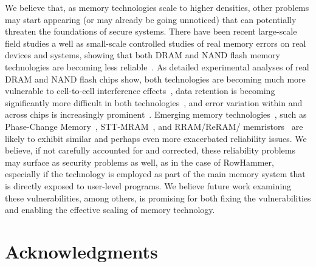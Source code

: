 \documentclass[runningheads]{llncs}
\begin{document}
We believe that, as memory technologies scale to higher densities,
other problems may start appearing (or may already be going unnoticed)
that can potentially threaten the foundations of secure systems. There
have been recent large-scale field studies a well as small-scale
controlled studies of real memory errors on real devices and systems,
showing that both DRAM and NAND flash memory technologies are becoming
less reliable~\cite{superfri14,justin-memerrors-dsn15,dram-field-analysis2,dram-field-analysis3,dram-field-analysis4,justin-flash-sigmetrics15,flash-field-analysis2,cai2017errors,cai2017error,luo2018improving,luo2018heatwatch,cai-date12,cai-hpca15,mutlu-imw13,patel2017reach,onur-date17}. As detailed experimental
analyses of real DRAM and NAND flash chips show, both technologies are
becoming much more vulnerable to cell-to-cell interference
effects~\cite{superfri14,rowhammer-isca2014,cai-dsn15,cai-sigmetrics14,cai-iccd13,cai-date12,cai-date13,flash-fms-talk,yixin-jsac16,cai-hpca17,cai2017errors,cai2017error,mutlu-imw13,onur-date17}, data retention is becoming significantly more
difficult in both technologies~\cite{raidr,samira-sigmetrics14,dram-isca2013,khan-dsn16,avatar-dsn15,darp-hpca2014,kang-memforum2014,mandelman-jrd02,cai-hpca15,cai-iccd12,warm-msst15,cai-date12,cai-date13,cai-itj2013,flash-fms-talk,memcon-cal16,cai2017errors,cai2017error,luo2018improving,luo2018heatwatch,superfri14,mutlu-imw13}, and error variation
within and across chips is increasingly prominent~\cite{dram-isca2013,aldram,kevinchang-sigmetrics16,dram-process-variation-3,cai-date12,cai-date13,lee2017design,kim2018solar,kim2018dram,kim2019drange}.  Emerging memory technologies~\cite{mutlu-imw13,meza-weed13}, such as Phase-Change Memory~\cite{pcm-isca09,zhou-isca09,moin-isca09,moin-micro09,wong-pcm,raoux-pcm,pcm-ieeemicro10,pcm-cacm10,justin-taco14,rbla},
STT-MRAM~\cite{chen-ieeetmag10,kultursay-ispass13}, and
RRAM/ReRAM/
memristors~\cite{wong-rram} are likely to exhibit similar
and perhaps even more exacerbated reliability issues. We believe, if
not carefully accounted for and corrected, these reliability problems
may surface as security problems as well, as in the case of RowHammer,
especially if the technology is employed as part of the main memory
system that is directly exposed to user-level programs. We believe
future work examining these vulnerabilities, among others, is
promising for both fixing the vulnerabilities and enabling the
effective scaling of memory technology.


\section*{Acknowledgments}
\end{document}
